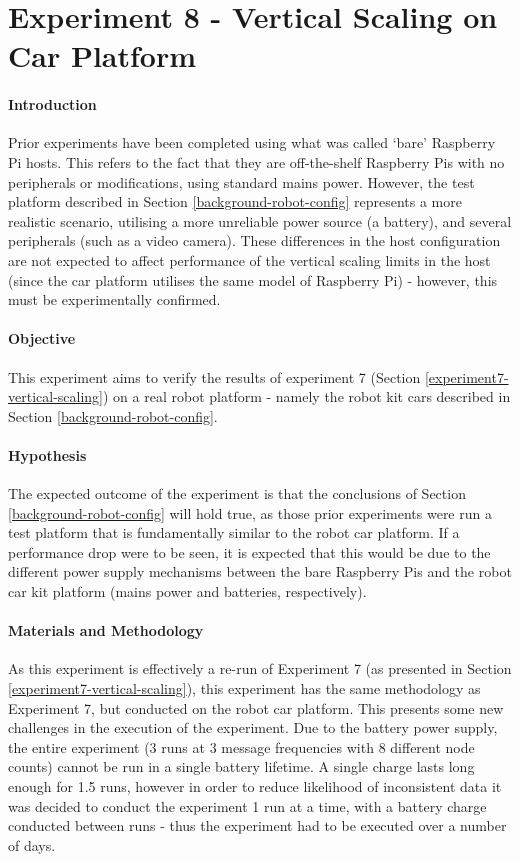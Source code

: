 \documentclass[../dissertation.tex]{subfiles}
\begin{document}
\section{Experiment 8 - Vertical Scaling on Car Platform}
\label{experiment8-vertical-scaling}

\paragraph{Introduction} Prior experiments have been completed using what was called `bare' Raspberry Pi hosts. This refers to the fact that they are off-the-shelf Raspberry Pis with no peripherals or modifications, using standard mains power. However, the test platform described in Section \ref{background-robot-config} represents a more realistic scenario, utilising a more unreliable power source (a battery), and several peripherals (such as a video camera). These differences in the host configuration are not expected to affect performance of the vertical scaling limits in the host (since the car platform utilises the same model of Raspberry Pi) - however, this must be experimentally confirmed.

\paragraph{Objective} This experiment aims to verify the results of experiment 7 (Section \ref{experiment7-vertical-scaling}) on a real robot platform - namely the robot kit cars described in Section \ref{background-robot-config}.

\paragraph{Hypothesis} The expected outcome of the experiment is that the conclusions of Section \ref{background-robot-config} will hold true, as those prior experiments were run a test platform that is fundamentally similar to the robot car platform. If a performance drop were to be seen, it is expected that this would be due to the different power supply mechanisms between the bare Raspberry Pis and the robot car kit platform (mains power and batteries, respectively).

\paragraph{Materials and Methodology} As this experiment is effectively a re-run of Experiment 7 (as presented in Section \ref{experiment7-vertical-scaling}), this experiment has the same methodology as Experiment 7, but conducted on the robot car platform. This presents some new challenges in the execution of the experiment. Due to the battery power supply, the entire experiment (3 runs at 3 message frequencies with 8 different node counts) cannot be run in a single battery lifetime. A single charge lasts long enough for 1.5 runs, however in order to reduce likelihood of inconsistent data it was decided to conduct the experiment 1 run at a time, with a battery charge conducted between runs - thus the experiment had to be executed over a number of days.
\end{document}
